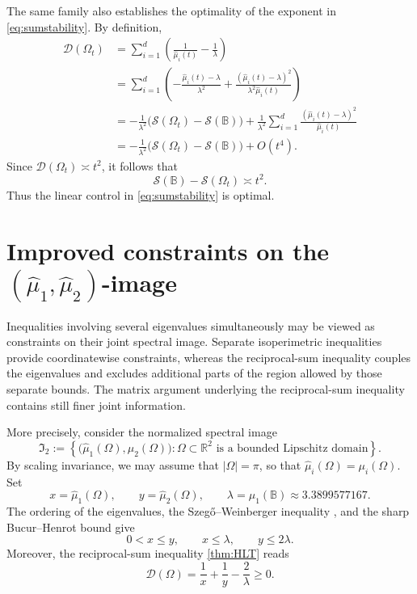 \documentclass{amsart}
\numberwithin{equation}{section}
\theoremstyle{plain}
\theoremstyle{definition}
\theoremstyle{plain}
\theoremstyle{remark}
\numberwithin{figure}{section}
\newcommand{\B}{\mathbb{B}}
\newcommand{\muu}{\widehat{\mu}}
\newcommand{\D}{\mathcal{D}(\Omega)}
\begin{document}
The same family also establishes the optimality of the exponent in \cref{eq:sumstability}. By definition,
\[
\begin{aligned}
    \mathcal{D}(\Omega_t) & = \sum_{i=1}^d \left(\frac{1}{\muu_i(t)}-\frac{1}{\lambda}\right) \\
    & = \sum_{i=1}^d \left(-\frac{\muu_i(t)-\lambda}{\lambda^2}+\frac{(\muu_i(t)-\lambda)^2}{\lambda^2\muu_i(t)}\right)\\
    & = -\frac{1}{\lambda^2}\big(\mathcal{S}(\Omega_t)-\mathcal{S}(\B)\big) + \frac{1}{\lambda^2}\sum_{i=1}^d \frac{(\muu_i(t)-\lambda)^2}{\muu_i(t)}\\
    & = -\frac{1}{\lambda^2}\big(\mathcal{S}(\Omega_t)-\mathcal{S}(\B)\big) + O(t^4).
\end{aligned}
\]
Since $\mathcal{D}(\Omega_t)\asymp t^2$, it follows that
\[
    \mathcal{S}(\B)-\mathcal{S}(\Omega_t)\asymp t^2.
\]
Thus the linear control in \cref{eq:sumstability} is optimal.



\section{Improved constraints on the \texorpdfstring{$(\muu_1,\muu_2)$}{(mu1, mu2)}-image}

Inequalities involving several eigenvalues simultaneously may be viewed as constraints on their joint spectral image. Separate isoperimetric inequalities provide coordinatewise constraints, whereas the reciprocal-sum inequality couples the eigenvalues and excludes additional parts of the region allowed by those separate bounds. The matrix argument underlying the reciprocal-sum inequality contains still finer joint information.


More precisely, consider the normalized spectral image
\[
    \mathfrak{I}_2 := \left\{ \big(\muu_1(\Omega),\muu_2(\Omega)\big): \Omega\subset\mathbb{R}^2 \text{ is a bounded Lipschitz domain} \right\}.
\]
By scaling invariance, we may assume that $|\Omega|=\pi$, so that
$\muu_i(\Omega)=\mu_i(\Omega)$. Set
\[
    x=\muu_1(\Omega),\qquad y=\muu_2(\Omega),\qquad \lambda=\mu_1(\B)\approx3.3899577167.
\]
The ordering of the eigenvalues, the Szeg\H{o}--Weinberger inequality \cite{Wein56}, and the sharp Bucur--Henrot bound \cite{BH19} give
\begin{equation}
    \label{eq:image-basic-bounds}
    0<x\leq y,\qquad x\leq\lambda,\qquad y\leq 2\lambda.
\end{equation}
Moreover, the reciprocal-sum inequality \cref{thm:HLT} reads
\begin{equation}
    \label{eq:image-deficit}
    \D=\frac{1}{x}+\frac{1}{y}-\frac{2}{\lambda}\geq0.
\end{equation}
\end{document}
